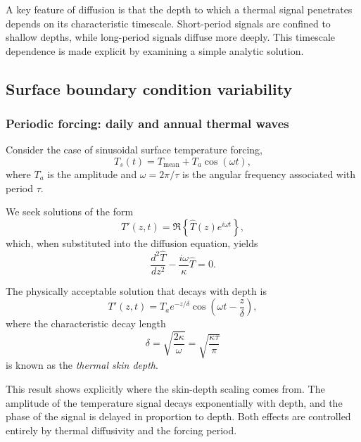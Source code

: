 A key feature of diffusion is that the depth to which a thermal signal penetrates depends on its characteristic timescale. Short-period signals are confined to shallow depths, while long-period signals diffuse more deeply. This timescale dependence is made explicit by examining a simple analytic solution.

\subsection{Surface boundary condition variability}

\subsubsection*{Periodic forcing: daily and annual thermal waves}

Consider the case of sinusoidal surface temperature forcing,
\begin{equation}
    T_s(t) = T_{\mathrm{mean}} + T_a \cos(\omega t),
\end{equation}
where $T_a$ is the amplitude and $\omega = 2\pi/\tau$ is the angular frequency associated with period $\tau$.

We seek solutions of the form
\begin{equation}
    T'(z,t) = \Re\left\{ \hat{T}(z) e^{i\omega t} \right\},
\end{equation}
which, when substituted into the diffusion equation, yields
\begin{equation}
    \frac{d^2 \hat{T}}{dz^2} - \frac{i\omega}{\kappa} \hat{T} = 0.
\end{equation}

The physically acceptable solution that decays with depth is
\begin{equation}
    T'(z,t) = T_a e^{-z/\delta} \cos\!\left(\omega t - \frac{z}{\delta}\right),
\end{equation}
where the characteristic decay length
\begin{equation}
    \delta = \sqrt{\frac{2\kappa}{\omega}} = \sqrt{\frac{\kappa \tau}{\pi}}
\end{equation}
is known as the \emph{thermal skin depth}.

This result shows explicitly where the skin-depth scaling comes from. The amplitude of the temperature signal decays exponentially with depth, and the phase of the signal is delayed in proportion to depth. Both effects are controlled entirely by thermal diffusivity and the forcing period.

